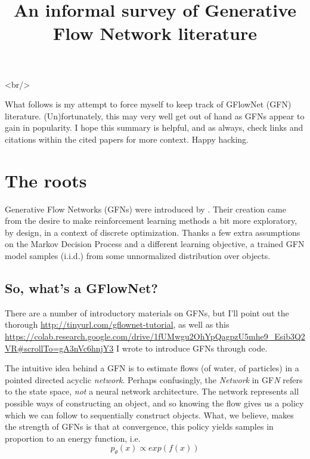 

\extrahead{}

\title{An informal survey of Generative Flow Network literature}

<br/>

What follows is my attempt to force myself to keep track of GFlowNet (GFN) literature. (Un)fortunately, this may very well get out of hand as GFNs appear to gain in popularity. I hope this summary is helpful, and as always, check links and citations within the cited papers for more context. Happy hacking.

\donumbersections
\tableofcontents

\section{The roots}

Generative Flow Networks (GFNs) were introduced by \citet{bengio2021flow}. Their creation came from the desire to make reinforcement learning methods a bit more exploratory, by design, in a context of discrete optimization. Thanks a few extra assumptions on the Markov Decision Process and a different learning objective, a trained GFN model samples (i.i.d.) from some unnormalized distribution over objects.

\subsection{So, what's a GFlowNet?}

There are a number of introductory materials on GFNs, but I'll point out the thorough \href{tutorial written by Yoshua, Kolya Malkin, and Moksh Jain}{http://tinyurl.com/gflownet-tutorial}, as well as this \href{Colab tutorial}{https://colab.research.google.com/drive/1fUMwgu2OhYpQagpzU5mhe9_Esib3Q2VR#scrollTo=gA3nVc6hnjY3} I wrote to introduce GFNs through code.

The intuitive idea behind a GFN is to estimate flows (of water, of particles) in a pointed directed acyclic \emph{network}. Perhaps confusingly, the \emph{Network} in GF\emph{N} refers to the state space, \emph{not} a neural network architecture. The network represents all possible ways of constructing an object, and so knowing the flow gives us a policy which we can follow to sequentially construct objects. What, we believe, makes the strength of GFNs is that at convergence, this policy yields samples in proportion to an energy function, i.e. $$p_\theta(x) \propto exp(f(x))$$

